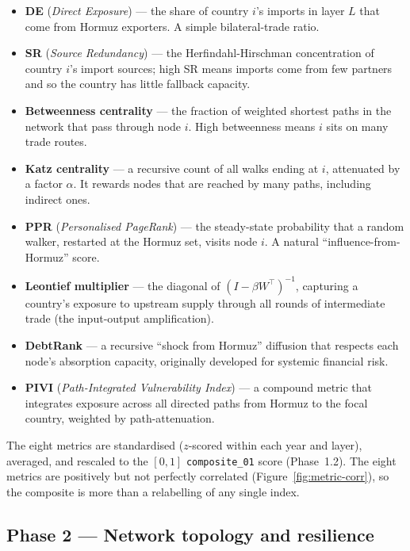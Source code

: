 \documentclass[11pt,a4paper]{article}
\begin{document}
\begin{itemize}[leftmargin=1.4em, itemsep=0.15em]
  \item \textbf{DE} (\emph{Direct Exposure}) --- the share of country
        $i$'s imports in layer $L$ that come from Hormuz exporters.
        A simple bilateral-trade ratio.
  \item \textbf{SR} (\emph{Source Redundancy}) --- the
        Herfindahl-Hirschman concentration of country $i$'s import
        sources; high SR means imports come from few partners and so
        the country has little fallback capacity.
  \item \textbf{Betweenness centrality} --- the fraction of weighted
        shortest paths in the network that pass through node $i$.
        High betweenness means $i$ sits on many trade routes.
  \item \textbf{Katz centrality} --- a recursive count of all walks
        ending at $i$, attenuated by a factor $\alpha$. It rewards
        nodes that are reached by many paths, including indirect ones.
  \item \textbf{PPR} (\emph{Personalised PageRank}) --- the steady-state
        probability that a random walker, restarted at the Hormuz set,
        visits node $i$. A natural ``influence-from-Hormuz'' score.
  \item \textbf{Leontief multiplier} --- the diagonal of
        $(I-\beta W^\top)^{-1}$, capturing a country's exposure to
        upstream supply through all rounds of intermediate trade
        (the input-output amplification).
  \item \textbf{DebtRank} \citep{battiston2012} --- a recursive
        ``shock from Hormuz'' diffusion that respects each node's
        absorption capacity, originally developed for systemic
        financial risk.
  \item \textbf{PIVI} (\emph{Path-Integrated Vulnerability Index}) ---
        a compound metric that integrates exposure across all
        directed paths from Hormuz to the focal country, weighted by
        path-attenuation.
\end{itemize}

The eight metrics are standardised ($z$-scored within each year and
layer), averaged, and rescaled to the $[0, 1]$ \texttt{composite\_01}
score (Phase~1.2). The eight metrics are positively but not perfectly
correlated (Figure~\ref{fig:metric-corr}), so the composite is more
than a relabelling of any single index.

\subsection{Phase 2 --- Network topology and resilience}
\end{document}
